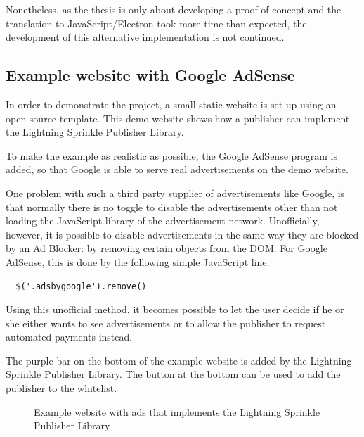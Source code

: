 Nonetheless, as the thesis is only about developing a proof-of-concept and the translation to JavaScript/Electron took more time than expected, the development of this alternative implementation is not continued.

\subsection{Example website with Google AdSense}
\label{sec:examplesite}
In order to demonstrate the project, a small static website is set up using an open source template. This demo website shows how a publisher can implement the Lightning Sprinkle Publisher Library. 

To make the example as realistic as possible, the Google AdSense program is added, so that Google is able to serve real advertisements on the demo website. 

One problem with such a third party supplier of advertisements like Google, is that normally there is no toggle to disable the advertisements other than not loading the JavaScript library of the advertisement network. Unofficially, however, it is possible to disable advertisements in the same way they are blocked by an Ad Blocker: by removing certain objects from the DOM. For Google AdSense, this is done by the following simple JavaScript line:


\lstset{language=JavaScript}
\lstset{frame=lines}
\lstset{basicstyle=\footnotesize}
\begin{lstlisting}
  $('.adsbygoogle').remove()
\end{lstlisting}

Using this unofficial method, it becomes possible to let the user decide if he or she either wants to see advertisements or to allow the publisher to request automated payments instead.

The purple bar on the bottom of the example website is added by the Lightning Sprinkle Publisher Library. The button at the bottom can be used to add the publisher to the whitelist.

\begin{figure}[h!]
  \setlength{\fboxsep}{0pt}%
  \caption{Example website with ads that implements the Lightning Sprinkle Publisher Library}
\end{figure}
